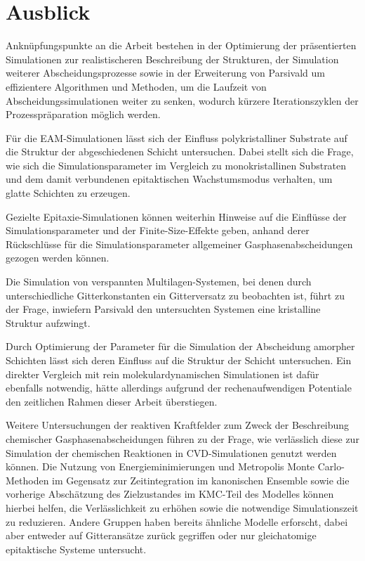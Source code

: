 \section{Ausblick}
Anknüpfungspunkte an die Arbeit bestehen in der Optimierung der präsentierten Simulationen zur realistischeren Beschreibung der Strukturen, der Simulation weiterer Abscheidungsprozesse sowie in der Erweiterung von Parsivald um effizientere Algorithmen und Methoden, um die Laufzeit von Abscheidungssimulationen weiter zu senken, wodurch kürzere Iterationszyklen der Prozesspräparation möglich werden.

Für die EAM-Simulationen lässt sich der Einfluss polykristalliner Substrate auf die Struktur der abgeschiedenen Schicht untersuchen.
Dabei stellt sich die Frage, wie sich die Simulationsparameter im Vergleich zu monokristallinen Substraten und dem damit verbundenen epitaktischen Wachstumsmodus verhalten, um glatte Schichten zu erzeugen.

Gezielte Epitaxie-Simulationen können weiterhin Hinweise auf die Einflüsse der Simulationsparameter und der Finite-Size-Effekte geben, anhand derer Rückschlüsse für die Simulationsparameter allgemeiner Gasphasenabscheidungen gezogen werden können.

Die Simulation von verspannten Multilagen-Systemen, bei denen durch unterschiedliche Gitterkonstanten ein Gitterversatz zu beobachten ist, führt zu der Frage, inwiefern Parsivald den untersuchten Systemen eine kristalline Struktur aufzwingt.

Durch Optimierung der Parameter für die Simulation der Abscheidung amorpher Schichten lässt sich deren Einfluss auf die Struktur der Schicht untersuchen.
Ein direkter Vergleich mit rein molekulardynamischen Simulationen ist dafür ebenfalls notwendig, hätte allerdings aufgrund der rechenaufwendigen Potentiale den zeitlichen Rahmen dieser Arbeit überstiegen.

Weitere Untersuchungen der reaktiven Kraftfelder zum Zweck der Beschreibung chemischer Gasphasenabscheidungen führen zu der Frage, wie verlässlich diese zur Simulation der chemischen Reaktionen in CVD-Simulationen genutzt werden können.
Die Nutzung von Energieminimierungen und Metropolis Monte Carlo-Methoden im Gegensatz zur Zeitintegration im kanonischen Ensemble sowie die vorherige Abschätzung des Zielzustandes im KMC-Teil des Modelles können hierbei helfen, die Verlässlichkeit zu erhöhen sowie die notwendige Simulationszeit zu reduzieren.
Andere Gruppen haben bereits ähnliche Modelle erforscht, dabei aber entweder auf Gitteransätze zurück gegriffen\cite{stamatakis_graph-theoretical_2011} oder nur gleichatomige epitaktische Systeme untersucht\cite{clark_hybrid_1996}.

